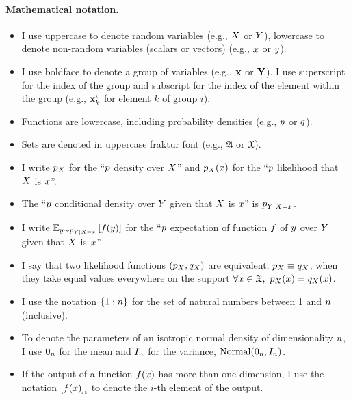 \documentclass[../thesis.tex]{subfiles}
\begin{document}
\paragraph{Mathematical notation.} 
\begin{itemize}
    \item I use uppercase to denote random variables (e.g., $\myrv{x}$ or $\myrv{y}$), lowercase to denote non-random variables (scalars or vectors) (e.g., $x$ or $y$).
    \item I use boldface to denote a group of variables (e.g., $\mathbf{{x}}$ or $\mathbf{{Y}}$). I use superscript for the index of the group and subscript for the index of the element within the group (e.g., $\mathbf{{x}}^i_k$ for element $k$ of group $i$).
    \item Functions are lowercase, including probability densities (e.g., $p$ or $q$).
    \item Sets are denoted in uppercase fraktur font (e.g., $\mathfrak{A}$ or $\mathfrak{X}$).
    \item I write $\myfunc{p}_{\myrv{x}}$ for the ``$p$ density over $\myrv{x}$'' and $\myfunc{p}_{\myrv{x}} (\myvect{x})$ for the ``$p$ likelihood that $\myrv{x}$ is $x$''.
    \item The ``$p$ conditional density over $\myrv{y}$ given that $\myrv{x}$ is $x$'' is $\myfunc{p}_{\myrv{y} | \myrv{x} = \myvect{x}}$.
    \item I write $\myexp{p}{\myscal{y}}{\myrv{y} | \myrv{x} = \myvect{x}} \left[\myfunc{f} (\myscal{y})\right]$ for the ``$p$ expectation of function $f$ of $y$ over $\myrv{y}$ given that $\myrv{x}$ is $x$''.
    \item I say that two likelihood functions $(\myfunc{p}_{\myrv{x}}, \myfunc{q}_{\myrv{x}})$ are equivalent, $\myfunc{p}_{\myrv{x}} \equiv \myfunc{q}_{\myrv{x}}$, when they take equal values everywhere on the support $\forall x \in \mathfrak{X}, ~ \myfunc{p}_{\myrv{x}} (x) = \myfunc{q}_{\myrv{x}} (x)$.
    \item I use the notation $\{1:n\}$ for the set of natural numbers between 1 and $n$ (inclusive).
    \item To denote the parameters of an isotropic normal density of dimensionality $n$, I use $0_{n}$ for the mean and $I_{n}$ for the variance, $\mathrm{Normal}(0_{n},I_{n})$.
    \item If the output of a function $f(x)$ has more than one dimension, I use the notation $\left[ f(x) \right]_i$ to denote the $i$-th element of the output.
\end{itemize}
\end{document}
